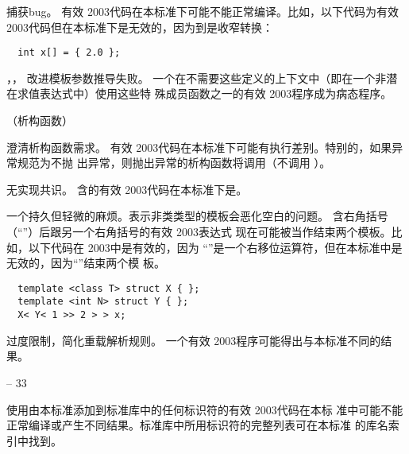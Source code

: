 \diffrat 捕获bug。
\diffeff 有效\cpp{} 2003代码在本标准下可能不能正常编译。比如，以下代码为有效
\cpp{} 2003代码但在本标准下是无效的，因为到是收窄转换：
\begin{lstlisting}
  int x[] = { 2.0 };
\end{lstlisting}

，，
\diffrat 改进模板参数推导失败。
\diffeff 一个在不需要这些定义的上下文中（即在一个非潜在求值表达式中）使用这些特
殊成员函数之一的有效\cpp{} 2003程序成为病态程序。

（析构函数）\par
{}
\diffrat 澄清析构函数需求。
\diffeff 有效\cpp{} 2003代码在本标准下可能有执行差别。特别的，如果异常规范为不抛
出异常，则抛出异常的析构函数将调用（不调用
）。

\diffrat 无实现共识。
\diffeff 含的有效\cpp{} 2003代码在本标准下是\illformed{}。

\diffrat 一个持久但轻微的麻烦。表示非类类型的模板会恶化空白的问题。
\diffeff \semchg 含右角括号（“\tm{>}”）后跟另一个右角括号的有效\cpp{} 2003表达式
现在可能被当作结束两个模板。比如，以下代码在\cpp{} 2003中是有效的，因为
“\tm{>{}>}”是一个右移位运算符，但在本标准中是无效的，因为“\tm{>{}>}”结束两个模
板。
\begin{lstlisting}
  template <class T> struct X { };
  template <int N> struct Y { };
  X< Y< 1 >> 2 > > x;
\end{lstlisting}

\diffrat 过度限制，简化重载解析规则。
\diffeff 一个有效\cpp{} 2003程序可能得出与本标准不同的结果。

 -- 33 \par
{}
\diffrat \featreq
\diffeff 使用由本标准添加到\cpp{}标准库中的任何标识符的有效\cpp{} 2003代码在本标
准中可能不能正常编译或产生不同结果。\cpp{}标准库中所用标识符的完整列表可在本标准
的库名索引中找到。

